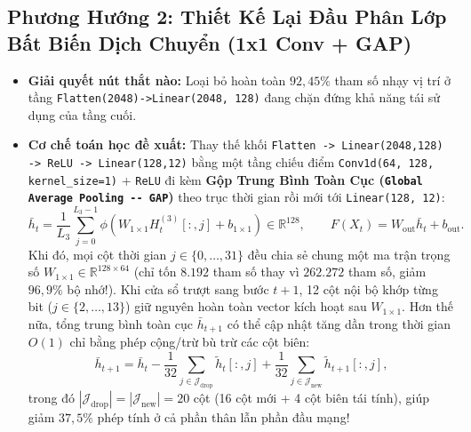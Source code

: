 \documentclass[11pt,a4paper]{article}
\newcommand{\R}{\mathbb{R}}
\newcommand{\abs}[1]{\left\lvert #1\right\rvert}
\newcommand{\code}[1]{{\small\ttfamily\nolinkurl{#1}}}
\begin{document}
\subsection{Phương Hướng 2: Thiết Kế Lại Đầu Phân Lớp Bất Biến Dịch Chuyển (1x1 Conv + GAP)}
\begin{itemize}
  \item \textbf{Giải quyết nút thắt nào:} Loại bỏ hoàn toàn $92,45\%$ tham số nhạy vị trí ở tầng \code{Flatten(2048)->Linear(2048, 128)} đang chặn đứng khả năng tái sử dụng của tầng cuối.
  \item \textbf{Cơ chế toán học đề xuất:} Thay thế khối \code{Flatten -> Linear(2048,128) -> ReLU -> Linear(128,12)} bằng một tầng chiếu điểm \code{Conv1d(64, 128, kernel\_size=1)} + \code{ReLU} đi kèm \textbf{Gộp Trung Bình Toàn Cục (\code{Global Average Pooling -- GAP})} theo trục thời gian rồi mới tới \code{Linear(128, 12)}:
  \begin{equation}
    \bar{h}_t = \frac{1}{L_3} \sum_{j=0}^{L_3 - 1} \phi\!\left(W_{1\times 1} H^{(3)}_t[:, j] + b_{1\times 1}\right) \in \R^{128}, \qquad F(X_t) = W_{\text{out}} \bar{h}_t + b_{\text{out}}.
  \end{equation}
  Khi đó, mọi cột thời gian $j \in \{0,\dots,31\}$ đều chia sẻ chung một ma trận trọng số $W_{1\times 1} \in \R^{128 \times 64}$ (chỉ tốn $8.192$ tham số thay vì $262.272$ tham số, giảm $96,9\%$ bộ nhớ!). Khi cửa sổ trượt sang bước $t+1$, 12 cột nội bộ khớp từng bit ($j \in \{2,\dots,13\}$) giữ nguyên hoàn toàn vector kích hoạt sau $W_{1\times 1}$. Hơn thế nữa, tổng trung bình toàn cục $\bar{h}_{t+1}$ có thể cập nhật tăng dần trong thời gian $O(1)$ chỉ bằng phép cộng/trừ bù trừ các cột biên:
  \begin{equation}
    \bar{h}_{t+1} = \bar{h}_t - \frac{1}{32} \sum_{j \in \mathcal{J}_{\text{drop}}} \tilde{h}_t[:, j] + \frac{1}{32} \sum_{j \in \mathcal{J}_{\text{new}}} \tilde{h}_{t+1}[:, j],
  \end{equation}
  trong đó $\abs{\mathcal{J}_{\text{drop}}} = \abs{\mathcal{J}_{\text{new}}} = 20$ cột (16 cột mới + 4 cột biên tái tính), giúp giảm $37,5\%$ phép tính ở cả phần thân lẫn phần đầu mạng!
\end{itemize}
\end{document}
